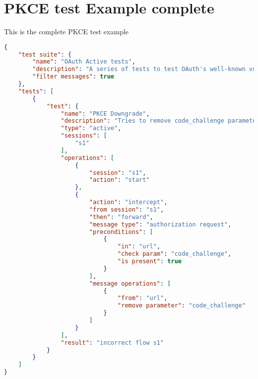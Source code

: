 \chapter{PKCE test Example complete}
\label{chap:PKCE_complete}
This is the complete PKCE test example
\begin{lstlisting}[language=json]
{
    "test suite": {
        "name": "OAuth Active tests",
        "description": "A series of tests to test OAuth's well-known vulnerabilities",
        "filter messages": true
    },
    "tests": [     
        {
            "test": {
                "name": "PKCE Downgrade",
                "description": "Tries to remove code_challenge parameter",
                "type": "active",
                "sessions": [
                    "s1"
                ],
                "operations": [
                    {
                        "session": "s1",
                        "action": "start"
                    },
                    {
                        "action": "intercept",
                        "from session": "s1",
                        "then": "forward",
                        "message type": "authorization request",
                        "preconditions": [
                            {
                                "in": "url",
                                "check param": "code_challenge",
                                "is present": true
                            }
                        ],
                        "message operations": [
                            {
                                "from": "url",
                                "remove parameter": "code_challenge"
                            }
                        ]
                    }
                ],
                "result": "incorrect flow s1"
            }
        }
    ]
}
\end{lstlisting}


